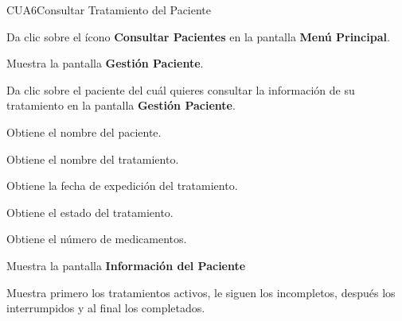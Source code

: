\begin{UseCase}{CUA6}{Consultar Tratamiento del Paciente}
{\begin{UClist}
		\end{UClist}		
	}

 \end{UseCase}

 \begin{UCtrayectoria}
 	
 	\UCpaso [\UCactor] Da clic sobre el ícono \textbf{Consultar Pacientes} en la pantalla \textbf{Menú Principal}.
 	
 	\UCpaso Muestra la pantalla	\textbf{Gestión Paciente}.
 	
 	\UCpaso [\UCactor] Da clic sobre el paciente del cuál quieres consultar la información de su tratamiento en la pantalla \textbf{Gestión Paciente}.
 	
 	\UCpaso Obtiene el nombre del paciente.
 	
 	\UCpaso Obtiene el nombre del tratamiento.
 	
 	\UCpaso Obtiene la fecha de expedición del tratamiento.
 	
 	\UCpaso Obtiene el estado del tratamiento.
 	
 	\UCpaso Obtiene el número de medicamentos.
 	
 	\UCpaso Muestra la pantalla \textbf{Información del Paciente}
 	
 	\UCpaso Muestra primero los tratamientos activos, le siguen los incompletos, después los interrumpidos y al final los completados.\label{cud6:Acciones}
 	
    
 \end{UCtrayectoria}


